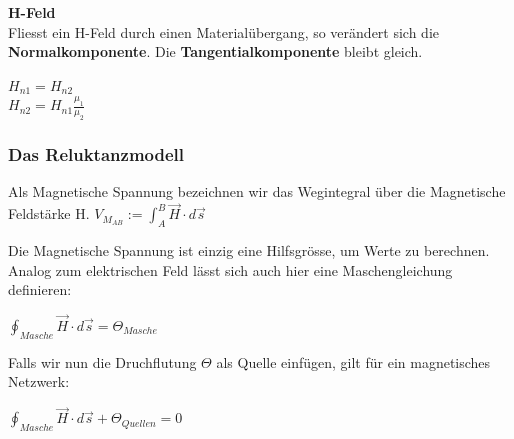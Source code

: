 \textbf{H-Feld} \\
Fliesst ein H-Feld durch einen Materialübergang, so verändert sich die \textbf{Normalkomponente}. Die \textbf{Tangentialkomponente} bleibt gleich.

\begin{center}
\end{center}

\formulaBegin
$ \displaystyle H_{n1} = H_{n2}$ \\ $\displaystyle H_{n2} = H_{n1} \frac{\mu_1}{\mu_2} $
\formulaEnd




\subsubsection{Das Reluktanzmodell}

	\beginip
	Als Magnetische Spannung bezeichnen wir das Wegintegral über die Magnetische Feldstärke H.
	\formulaBegin
	$\displaystyle V_{M_{AB}} := \int_A^B \vec{H} \cdot d\vec{s}$
	\formulaEnd

	Die Magnetische Spannung ist einzig eine Hilfsgrösse, um Werte zu berechnen. \\
	Analog zum elektrischen Feld lässt sich auch hier eine Maschengleichung definieren: \\
	\begin{center}
		$\displaystyle \oint_{Masche} \vec{H} \cdot d\vec{s} = \Theta_{Masche}$
	\end{center}
		Falls wir nun die Druchflutung $\Theta$ als Quelle einfügen, gilt für ein magnetisches Netzwerk:
		\begin{center}
			$\displaystyle \oint_{Masche} \vec{H} \cdot d\vec{s} + \Theta_{Quellen} = 0$
		\end{center}
	\iend

